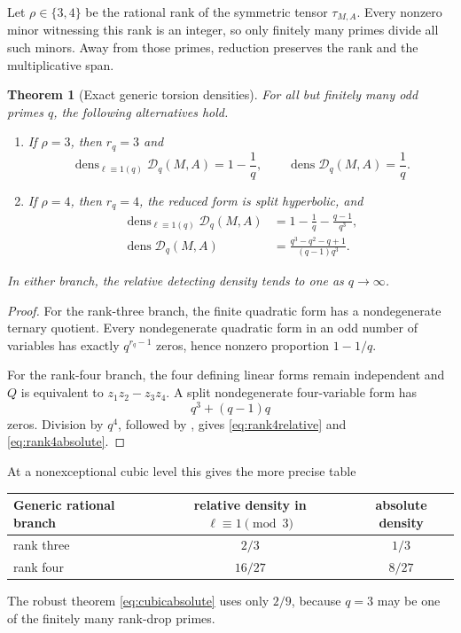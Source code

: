 \documentclass[11pt]{article}
\numberwithin{equation}{section}
\newtheorem{theorem}{Theorem}[section]
\theoremstyle{definition}
\theoremstyle{remark}
\newcommand{\dens}{\operatorname{dens}}
\begin{document}
Let \(\rho\in\{3,4\}\) be the rational rank of the symmetric tensor
\(\tau_{M,A}\).  Every nonzero minor witnessing this rank is an integer, so only finitely many
primes divide all such minors.  Away from those primes, reduction preserves the rank and the
multiplicative span.

\begin{theorem}[Exact generic torsion densities]
\label{thm:genericdensity}
For all but finitely many odd primes \(q\), the following alternatives hold.
\begin{enumerate}
\item If \(\rho=3\), then \(r_q=3\) and
\begin{equation}
 \dens_{\ell\equiv1(q)}\mathscr D_q(M,A)=1-\frac1q,
 \qquad
 \dens\mathscr D_q(M,A)=\frac1q.\label{eq:rank3density}
\end{equation}
\item If \(\rho=4\), then \(r_q=4\), the reduced form is split hyperbolic, and
\begin{align}
 \dens_{\ell\equiv1(q)}\mathscr D_q(M,A)
 &=1-\frac1q-\frac{q-1}{q^3},\label{eq:rank4relative}\\
 \dens\mathscr D_q(M,A)
 &=\frac{q^3-q^2-q+1}{(q-1)q^3}.\label{eq:rank4absolute}
\end{align}
\end{enumerate}
In either branch, the relative detecting density tends to one as \(q\to\infty\).
\end{theorem}

\begin{proof}
For the rank-three branch, the finite quadratic form has a nondegenerate ternary quotient.
Every nondegenerate quadratic form in an odd number of variables has exactly \(q^{r_q-1}\)
zeros, hence nonzero proportion \(1-1/q\).

For the rank-four branch, the four defining linear forms remain independent and
\(Q\) is equivalent to \(z_1z_2-z_3z_4\).  A split nondegenerate four-variable form has
\[
 q^3+(q-1)q
\]
zeros.  Division by \(q^4\), followed by , gives
\eqref{eq:rank4relative} and \eqref{eq:rank4absolute}.
\end{proof}

At a nonexceptional cubic level this gives the more precise table
\begin{center}
\begin{tabular}{@{}lcc@{}}
\toprule
Generic rational branch & relative density in \(\ell\equiv1\pmod3\) & absolute density \\
\midrule
rank three & \(2/3\) & \(1/3\) \\
rank four & \(16/27\) & \(8/27\) \\
\bottomrule
\end{tabular}
\end{center}
The robust theorem \eqref{eq:cubicabsolute} uses only \(2/9\), because \(q=3\) may be one of
the finitely many rank-drop primes.
\end{document}
